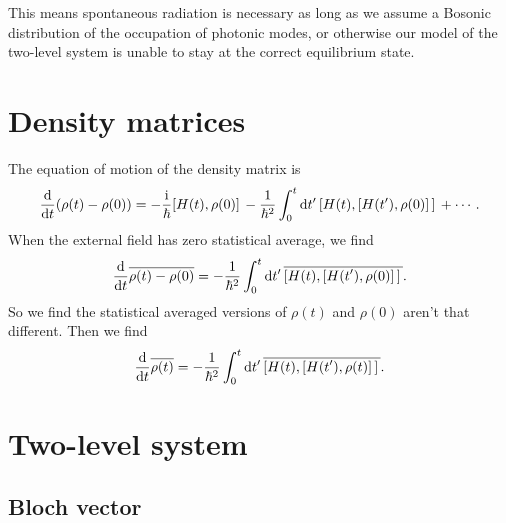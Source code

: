 \documentclass[hyperref, a4paper]{article}
\newcommand*{\ii}{\mathrm{i}}
\begin{document}
This means spontaneous radiation is necessary
as long as we assume a Bosonic distribution 
of the occupation of photonic modes, 
or otherwise our model of the two-level system is unable to 
stay at the correct equilibrium state. 

\section{Density matrices}

The equation of motion of the density matrix is 
\begin{equation}
    \dv{t} (\rho(t) - \rho(0))
    = - \frac{\ii}{\hbar} \comm*{H(t)}{\rho(0)} 
    - \frac{1}{\hbar^2} \int_{0}^{t} \dd{t'} \comm*{H(t)}{\comm*{H(t')}{\rho(0)}} + \cdots.
\end{equation}
When the external field has zero statistical average, 
we find 
\[
    \dv{t} \overline{
        \rho(t) - \rho(0)
    } = - \frac{1}{\hbar^2} \int_{0}^{t} \dd{t'} 
    \overline{\comm*{H(t)}{\comm*{H(t')}{\rho(0)}}}.
\]
So we find the statistical averaged versions of $\rho(t)$ and $\rho(0)$ aren't that different.
Then we find 
\begin{equation}
    \dv{t} \overline{\rho(t)} = - \frac{1}{\hbar^2} \int_{0}^{t} \dd{t'} 
    \overline{\comm*{H(t)}{\comm*{H(t')}{\rho(t)}}}.
\end{equation}





\section{Two-level system}

\subsection{Bloch vector}
\end{document}
